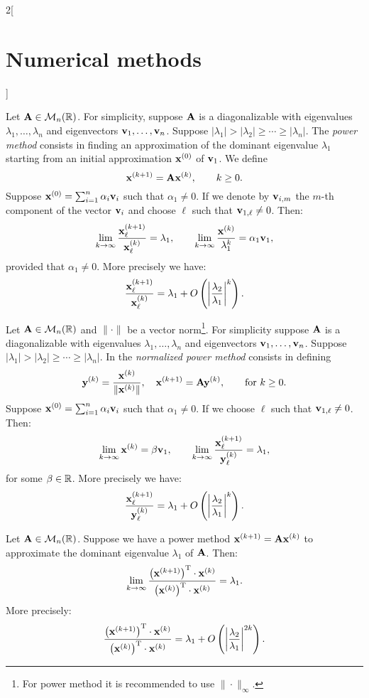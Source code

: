 \documentclass[../../../main.tex]{subfiles}
\begin{document}
\begin{multicols}{2}[\section{Numerical methods}]
\begin{definition}
    Let $\vb{A}\in\mathcal{M}_n(\mathbb{R})$. For simplicity, suppose $\vb{A}$ is a diagonalizable with eigenvalues $\lambda_1,\ldots,\lambda_n$ and eigenvectors $\vb{v}_1,\ldots,\vb{v}_n$. Suppose $|\lambda_1|>|\lambda_2|\geq\cdots\geq|\lambda_n|$. The \textit{power method} consists in finding an approximation of the dominant eigenvalue $\lambda_1$ starting from an initial approximation $\vb{x}^{(0)}$ of $\vb{v}_1$. We define $$\vb{x}^{(k+1)}=\vb{A}\vb{x}^{(k)},\qquad k\geq 0.$$ Suppose $\vb{x}^{(0)}=\sum_{i=1}^n\alpha_i\vb{v}_i$ such that $\alpha_1\ne0$. If we denote by $\vb{v}_{i,m}$ the $m$-th component of the vector $\vb{v}_i$ and choose $\ell$ such that $\vb{v}_{1,\ell}\ne0$. Then: $$\lim_{k\to\infty}\frac{\vb{x}_\ell^{(k+1)}}{\vb{x}_\ell^{(k)}}=\lambda_1,\qquad\lim_{k\to\infty}\frac{\vb{x}^{(k)}}{\lambda_1^k}=\alpha_1\vb{v}_1,$$ provided that $\alpha_1\ne0$. More precisely we have: $$\frac{\vb{x}_\ell^{(k+1)}}{\vb{x}_\ell^{(k)}}=\lambda_1+O\left(\left|\frac{\lambda_2}{\lambda_1}\right|^k\right).$$
\end{definition}
\begin{definition}
    Let $\vb{A}\in\mathcal{M}_n(\mathbb{R})$ and $\|\cdot\|$ be a vector norm\footnote{For power method it is recommended to use $\|\cdot\|_\infty$.}. For simplicity suppose $\vb{A}$ is a diagonalizable with eigenvalues $\lambda_1,\ldots,\lambda_n$ and eigenvectors $\vb{v}_1,\ldots,\vb{v}_n$. Suppose $|\lambda_1|>|\lambda_2|\geq\cdots\geq|\lambda_n|$. In the \textit{normalized power method} consists in defining $$\vb{y}^{(k)}=\frac{\vb{x}^{(k)}}{\|\vb{x}^{(k)}\|},\quad\vb{x}^{(k+1)}=\vb{A}\vb{y}^{(k)},\qquad\text{for }k\geq 0.$$ Suppose $\vb{x}^{(0)}=\sum_{i=1}^n\alpha_i\vb{v}_i$ such that $\alpha_1\ne0$. If we choose $\ell$ such that $\vb{v}_{1,\ell}\ne0$. Then: $$\lim_{k\to\infty}\vb{x}^{(k)}=\beta\vb{v}_1,\qquad\lim_{k\to\infty}\frac{\vb{x}_\ell^{(k+1)}}{\vb{y}_\ell^{(k)}}=\lambda_1,$$ for some $\beta\in\mathbb{R}$. More precisely we have: $$\frac{\vb{x}_\ell^{(k+1)}}{\vb{y}_\ell^{(k)}}=\lambda_1+O\left(\left|\frac{\lambda_2}{\lambda_1}\right|^k\right).$$
\end{definition}
\begin{definition}
    Let $\vb{A}\in\mathcal{M}_n(\mathbb{R})$. Suppose we have a power method $\vb{x}^{(k+1)}=\vb{A}\vb{x}^{(k)}$ to approximate the dominant eigenvalue $\lambda_1$ of $\vb{A}$. Then: $$\lim_{k\to\infty}\frac{\left(\vb{x}^{(k+1)}\right)^\mathrm{T}\cdot \vb{x}^{(k)}}{\left(\vb{x}^{(k)}\right)^\mathrm{T}\cdot\vb{x}^{(k)}}=\lambda_1.$$
    More precisely: $$\frac{\left(\vb{x}^{(k+1)}\right)^\mathrm{T}\cdot \vb{x}^{(k)}}{\left(\vb{x}^{(k)}\right)^\mathrm{T}\cdot\vb{x}^{(k)}}=\lambda_1+O\left(\left|\frac{\lambda_2}{\lambda_1}\right|^{2k}\right).$$
\end{definition}
\end{multicols}
\end{document}
